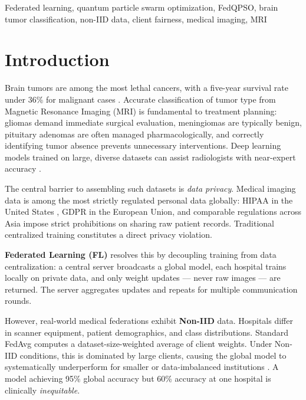 \documentclass[conference]{IEEEtran}
\begin{document}
\begin{IEEEkeywords}
Federated learning, quantum particle swarm optimization, FedQPSO, brain tumor
classification, non-IID data, client fairness, medical imaging, MRI
\end{IEEEkeywords}

\section{Introduction}
\label{sec:intro}

Brain tumors are among the most lethal cancers, with a five-year survival
rate under 36\% for malignant cases \cite{ostrom2021}. Accurate
classification of tumor type from Magnetic Resonance Imaging (MRI) is
fundamental to treatment planning: gliomas demand immediate surgical
evaluation, meningiomas are typically benign, pituitary adenomas are often
managed pharmacologically, and correctly identifying tumor absence prevents
unnecessary interventions. Deep learning models trained on large, diverse
datasets can assist radiologists with near-expert accuracy \cite{sultan2019}.

The central barrier to assembling such datasets is \emph{data privacy}.
Medical imaging data is among the most strictly regulated personal data
globally: HIPAA in the United States \cite{hipaa}, GDPR in the European
Union, and comparable regulations across Asia impose strict prohibitions on
sharing raw patient records. Traditional centralized training constitutes a
direct privacy violation.

\textbf{Federated Learning (FL)} \cite{mcmahan2017} resolves this by
decoupling training from data centralization: a central server broadcasts a
global model, each hospital trains locally on private data, and only weight
updates --- never raw images --- are returned. The server aggregates updates
and repeats for multiple communication rounds.

However, real-world medical federations exhibit \textbf{Non-IID} data.
Hospitals differ in scanner equipment, patient demographics, and class
distributions. Standard FedAvg \cite{mcmahan2017} computes a
dataset-size-weighted average of client weights. Under Non-IID conditions,
this is dominated by large clients, causing the global model to
systematically underperform for smaller or data-imbalanced institutions
\cite{zhao2018}. A model achieving 95\% global accuracy but 60\% accuracy
at one hospital is clinically \emph{inequitable}.
\end{document}
